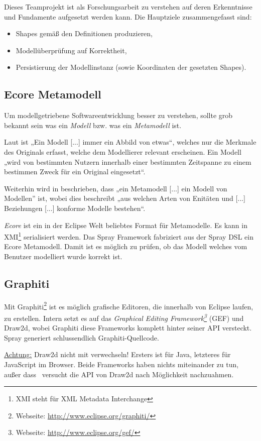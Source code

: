 Dieses Teamprojekt ist als Forschungsarbeit zu verstehen
auf deren Erkenntnisse und Fundamente aufgesetzt werden kann.
Die Hauptziele zusammengefasst sind:

\begin{itemize}
  \item Shapes gemäß den Definitionen produzieren,
  \item Modellüberprüfung auf Korrektheit,
  \item Persistierung der Modellinstanz (sowie Koordinaten der gesetzten Shapes).
\end{itemize}


\subsection{Ecore Metamodell}\label{sec.ecore}

Um modellgetriebene Softwareentwicklung besser zu verstehen,
sollte grob bekannt sein was ein \emph{Modell} bzw. was ein
\emph{Metamodell} ist.

Laut \citep[][S.~2-1]{drachen} ist „Ein Modell [...] immer ein Abbild von etwas“,
welches nur die Merkmale des Originals erfasst, welche dem Modellierer
relevant erscheinen.
Ein Modell „wird von bestimmten Nutzern innerhalb einer bestimmten Zeitspanne
zu einem bestimmen Zweck für ein Original eingesetzt“.

Weiterhin wird in \citep[][S.~2-5]{drachen} beschrieben, dass
„ein Metamodell [...] ein Modell von Modellen” ist, wobei dies beschreibt
„aus welchen Arten von Enitäten und [...] Beziehungen [...] konforme Modelle
bestehen“.

\emph{Ecore} ist ein in der Eclipse Welt beliebtes Format für Metamodelle.
Es kann in XMI\footnote{XMI steht für XML Metadata Interchange} serialisiert
werden. Das Spray Framework fabriziert aus der Spray DSL ein Ecore Metamodell.
Damit ist es möglich zu prüfen, ob das Modell welches vom
Benutzer modelliert wurde korrekt ist.


\subsection{Graphiti}

Mit Graphiti\footnote{Webseite: \url{http://www.eclipse.org/graphiti/}}
ist es möglich grafische Editoren, die innerhalb von Eclipse laufen, zu erstellen.
Intern setzt es auf das \emph{Graphical Editing
Framework\footnote{Webseite: \url{http://www.eclipse.org/gef/}}} (GEF)
und Draw2d, wobei Graphiti diese Frameworks komplett hinter seiner API
versteckt. Spray generiert schlussendlich Graphiti-Quellcode.
\citep[sinngemäß aus][S.~2]{sprayPaper}

\underline{Achtung:}
Draw2d nicht mit \emph{\dd} verwechseln! Ersters ist für Java,
letzteres für JavaScript im Browser. Beide Frameworks haben nichts miteinander
zu tun, außer dass \dd~versucht die API von Draw2d nach Möglichkeit
nachzuahmen.
